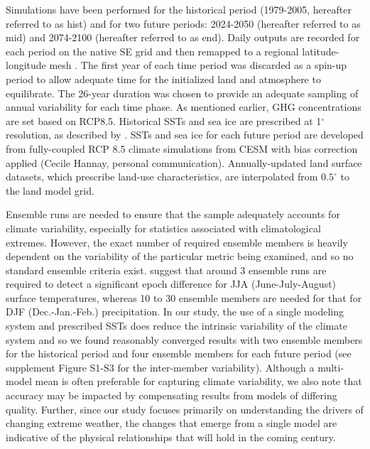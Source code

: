 \documentclass{ametsoc}
\begin{document}
Simulations have been performed for the historical period (1979-2005, hereafter referred to as \textsf{hist}) and for two future periods: 2024-2050 (hereafter referred to as \textsf{mid}) and 2074-2100 (hereafter referred to as \textsf{end}).  Daily outputs are recorded for each period on the native SE grid and then remapped to a regional latitude-longitude mesh \citep{ullrich2015arbitrary,ullrich2016arbitrary}. The first year of each time period was discarded as a spin-up period to allow adequate time for the initialized land and atmosphere to equilibrate. The 26-year duration was chosen to provide an adequate sampling of annual variability for each time phase. As mentioned earlier, GHG concentrations are set based on RCP8.5. Historical SSTs and sea ice are prescribed at 1$^\circ$ resolution, as described by \citet{hurrell2008new}. SSTs and sea ice for each future period are developed from fully-coupled RCP 8.5 climate simulations from CESM with bias correction applied  (Cecile Hannay, personal communication). Annually-updated land surface datasets, which prescribe land-use characteristics, are interpolated from $0.5^\circ$ to the land model grid.

Ensemble runs are needed to ensure that the sample adequately accounts for climate variability, especially for statistics associated with climatological extremes. However, the exact number of required ensemble members is heavily dependent on the variability of the particular metric being examined, and so no standard ensemble criteria exist. \cite{deser2012uncertainty} suggest that around 3 ensemble runs are required to detect a significant epoch difference for JJA (June-July-August) surface temperatures, whereas 10 to 30 ensemble members are needed for that for DJF (Dec.-Jan.-Feb.) precipitation. In our study, the use of a single modeling system and prescribed SSTs does reduce the intrinsic variability of the climate system and so we found reasonably converged results with two ensemble members for the historical period and four ensemble members for each future period (see supplement Figure S1-S3 for the inter-member variability).  Although a multi-model mean is often preferable for capturing climate variability, we also note that accuracy may be impacted by compensating results from models of differing quality.  Further, since our study focuses primarily on understanding the drivers of changing extreme weather, the changes that emerge from a single model are indicative of the physical relationships that will hold in the coming century.
\end{document}
